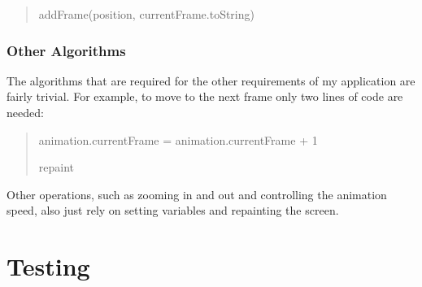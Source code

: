 \documentclass[a4paper, 11pt]{article}
\begin{document}
\begin{quotation}
\begin{tt}

addFrame(position, currentFrame.toString) \par

\end{tt}
\end{quotation}



\subsubsection{Other Algorithms}

The algorithms that are required for the other requirements of my application are fairly trivial. For example, to move to the next frame only two lines of code are needed:

\begin{quotation}
\begin{tt}

animation.currentFrame = animation.currentFrame + 1 \par
repaint \par

\end{tt}
\end{quotation}

Other operations, such as zooming in and out and controlling the animation speed, also just rely on setting variables and repainting the screen.

\newpage

\section{Testing}
\end{document}
